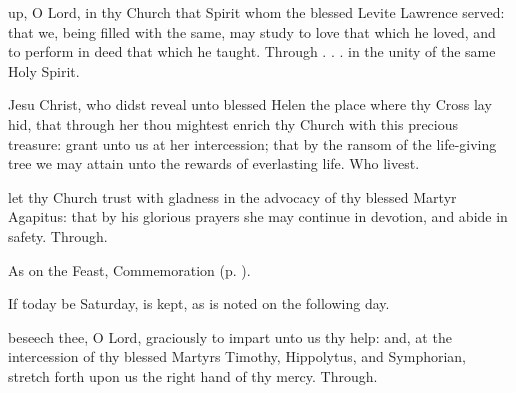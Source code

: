 \clearpage
{}

{} up, O Lord, in thy Church that Spirit whom the blessed Levite Lawrence served: that we, being filled with the same, may study to love that which he loved, and to perform in deed that which he taught. Through . . . in the unity of the same Holy Spirit.



\memorialCollect
{} Jesu Christ, who didst reveal unto blessed Helen the place where thy Cross lay hid, that through her thou mightest enrich thy Church with this precious treasure: grant unto us at her intercession; that by the ransom of the life-giving tree we may attain unto the rewards of everlasting life. Who livest.



\memorialCollect
{} let thy Church trust with gladness in the advocacy of thy blessed Martyr Agapitus: that by his glorious prayers she may continue in devotion, and abide in safety. Through.



\begin{rubric}
	As on the Feast, Commemoration  (p. \pageref{TimothyHippolytusSymphorianCollect}).
\end{rubric}
\begin{rubric}
	If today be Saturday,  is kept, as is noted on the following day.
\end{rubric}



\memorialCollect\label{TimothyHippolytusSymphorianCollect}
 beseech thee, O Lord, graciously to impart unto us thy help: and, at the intercession of thy blessed Martyrs Timothy, Hippolytus, and Symphorian, stretch forth upon us the right hand of thy mercy. Through.


